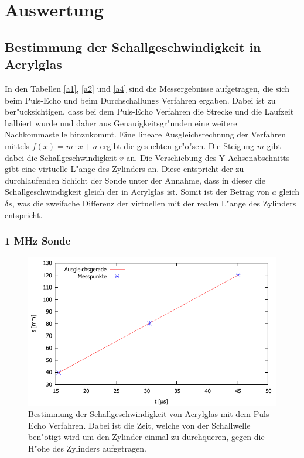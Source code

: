 \section{Auswertung}
\label{sec:auswertung}

\subsection{Bestimmung der Schallgeschwindigkeit in Acrylglas} %
\label{sub:bestimmung_der_schallgeschwindigkeit_in_acrylglas}





In den Tabellen \ref{a1}, \ref{a2} und \ref{a4} sind die Messergebnisse aufgetragen, die sich beim Puls-Echo und beim Durchschallungs Verfahren ergaben. Dabei ist zu ber"ucksichtigen, dass bei dem Puls-Echo Verfahren die Strecke und die Laufzeit halbiert wurde und daher aus Genauigkeitsgr"unden eine weitere Nachkommastelle hinzukommt.
Eine lineare Ausgleichsrechnung der Verfahren mittels $f(x) = m \cdot x + a$ ergibt die gesuchten gr"o"sen. Die Steigung $m$ gibt dabei die Schallgeschwindigkeit $v$ an. Die Verschiebung des Y-Achsenabschnitts gibt eine virtuelle L"ange des Zylinders an. Diese entspricht der zu durchlaufenden Schicht der Sonde unter der Annahme, dass in dieser die Schallgeschwindigkeit gleich der in Acrylglas ist. Somit ist der Betrag von $a$ gleich $\delta s$, was die zweifache Differenz der virtuellen mit der realen L"ange des Zylinders entspricht.

\subsubsection{1 MHz Sonde} %
\label{sub:1_mhz_sonde}

\begin{figure}[!h]
	\centering
	\includegraphics[width = 13cm]{img/a1e.pdf}
	\caption{Bestimmung der Schallgeschwindigkeit von Acrylglas mit dem Puls-Echo Verfahren. Dabei ist die Zeit, welche von der Schallwelle ben"otigt wird um den Zylinder einmal zu durchqueren, gegen die H"ohe des Zylinders aufgetragen.}
	\label{a1e}
\end{figure}

